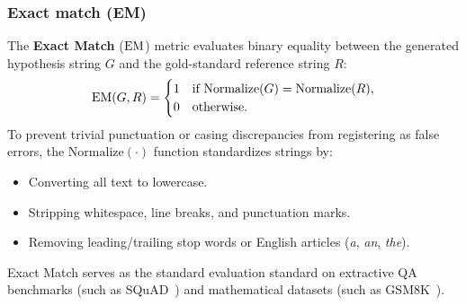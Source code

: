 \documentclass[../../main.tex]{subfiles}
\begin{document}
\subsubsection{Exact match (EM)}
The \textbf{Exact Match} ($\mathrm{EM}$) metric evaluates binary equality between the generated hypothesis string $G$ and the gold-standard reference string $R$:
\begin{equation}
\label{eq:exact_match_def}
\mathrm{EM}(G, R) = \begin{cases} 
1 & \text{if } \text{Normalize}(G) = \text{Normalize}(R), \\
0 & \text{otherwise}.
\end{cases}
\end{equation}
To prevent trivial punctuation or casing discrepancies from registering as false errors, the $\text{Normalize}(\cdot)$ function standardizes strings by:
\begin{itemize}
    \item Converting all text to lowercase.
    \item Stripping whitespace, line breaks, and punctuation marks.
    \item Removing leading/trailing stop words or English articles (\textit{a}, \textit{an}, \textit{the}).
\end{itemize}
Exact Match serves as the standard evaluation standard on extractive QA benchmarks (such as SQuAD~\cite{rajpurkar2016squad}) and mathematical datasets (such as GSM8K~\cite{cobbe2021gsm8k}).
\end{document}
